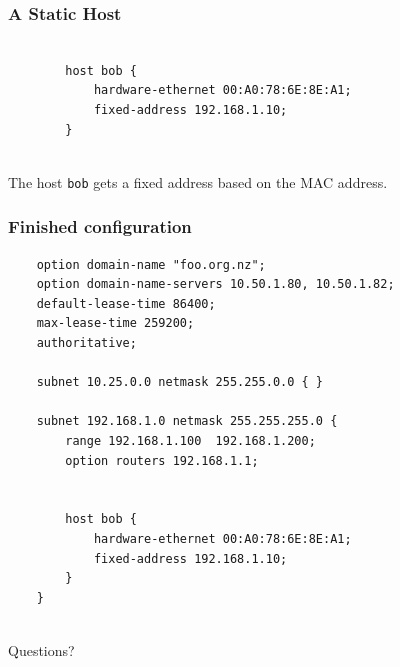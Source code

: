 \documentclass[10pt]{beamer}
\begin{document}
	\begin{frame}[fragile]
		\frametitle{A Static Host}
		\begin{verbatim}
		
		host bob {
		    hardware-ethernet 00:A0:78:6E:8E:A1;
		    fixed-address 192.168.1.10;
		}
		
		\end{verbatim}  
		
		The host \texttt{bob} gets a fixed address based on the MAC address.    
		
	\end{frame}

\begin{frame}[fragile]
	\frametitle{Finished configuration}
	\begin{verbatim}
	option domain-name "foo.org.nz";
	option domain-name-servers 10.50.1.80, 10.50.1.82;
	default-lease-time 86400;
	max-lease-time 259200;
	authoritative;
	
	subnet 10.25.0.0 netmask 255.255.0.0 { }
	
	subnet 192.168.1.0 netmask 255.255.255.0 {
	    range 192.168.1.100  192.168.1.200;
	    option routers 192.168.1.1;
	
	
	    host bob {
	        hardware-ethernet 00:A0:78:6E:8E:A1;
	        fixed-address 192.168.1.10;
	    }
	}
	
	\end{verbatim}
\end{frame}	

\begin{frame}
	Questions?
\end{frame}
\end{document}
